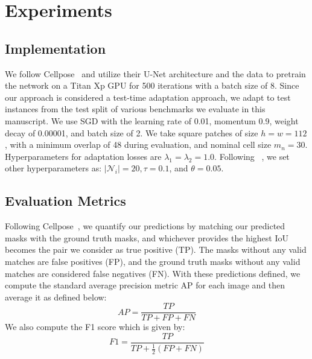 \section{Experiments}
\subsection{Implementation}

We follow Cellpose~\cite{stringer2021cellpose} and utilize their U-Net architecture and the data to pretrain the network on a Titan Xp GPU for 500 iterations with a batch size of 8. Since our approach is considered a test-time adaptation approach, we adapt to test instances from the test split of various benchmarks we evaluate in this manuscript. We use SGD with the learning rate of 0.01, momentum 0.9, weight decay of 0.00001, and batch size of 2. We take square patches of size $h=w=112$, with a minimum overlap of 48 during evaluation, and nominal cell size $m_n = 30$. Hyperparameters for adaptation losses are $\lambda_1 = \lambda_2 = 1.0$.  Following ~\cite{keaton2023celltranspose}, we set other hyperparameters as: $|\mathcal{N}_i|=20, \tau=0.1$, and $\theta=0.05$.

\subsection{Evaluation Metrics}
Following Cellpose~\cite{stringer2021cellpose}, we quantify our predictions by matching our predicted masks with the ground truth masks, and whichever provides the highest IoU becomes the pair we consider as true positive (TP). The masks without any valid matches are false positives (FP), and the ground truth masks without any valid matches are considered false negatives (FN). With these predictions defined, we compute the standard average precision metric AP for each image and then average it as defined below:
\begin{equation}
    AP = \frac{TP}{TP+FP+FN}
\end{equation}   
We also compute the F1 score which is given by:
\begin{equation}
    F1 = \frac{TP}{TP+\frac{1}{2}(FP+FN)}
\end{equation} 


